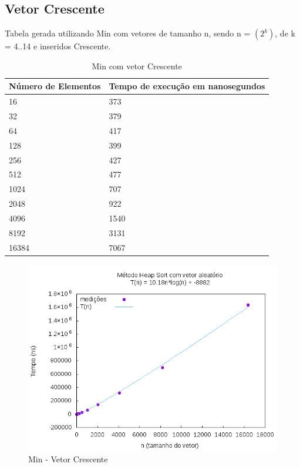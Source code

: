 \documentclass[12pt,a4paper,twoside]{report}
\begin{document}
\subsection{Vetor Crescente}
Tabela gerada utilizando Min com vetores de tamanho n, sendo n = $(2^k)$, de k = 4..14 e inseridos Crescente.
\begin{table}[H]
\centering
\caption{Min com vetor Crescente}
\label{my-label}
\begin{tabular}{|l|l|}
\hline
\multicolumn{1}{|c|}{\textbf{Número de Elementos}} & \multicolumn{1}{c|}{\textbf{Tempo de execução em nanosegundos}} \\ \hline
16 & 373 \\ \hline
32 & 379 \\ \hline
64 & 417 \\ \hline
128 & 399 \\ \hline
256 & 427 \\ \hline
512 & 477 \\ \hline
1024 & 707 \\ \hline
2048 & 922 \\ \hline
4096 & 1540 \\ \hline
8192 & 3131 \\ \hline
16384 & 7067 \\ \hline
\end{tabular}
\end{table}

\begin{figure}[H]
    \centering
    \includegraphics[width=0.7\linewidth]{graficos/HeapSort/vIntAleatorio/vIntAleatorio.png}
  \caption{Min - Vetor Crescente}
\end{figure}
\end{document}

